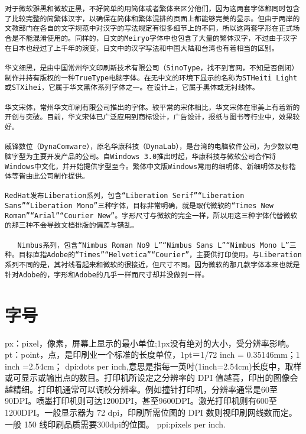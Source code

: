 \begin{verbatim}
对于微软雅黑和微软正黑，不好简单的用简体或者繁体来区分他们，因为这两套字体都同时包含了比较完整的简繁体汉字，以确保在简体和繁体混排的页面上都能够完美的显示。但由于两岸的文教部门在各自的文字规范中对汉字的写法规定有很多细节上的不同，所以这两套字形在正式场合是不能混淆使用的。同样的，日文的Meiryo字体中也包含了大量的繁体汉字，不过由于汉字在日本也经过了上千年的演变，日文中的汉字写法和中国大陆和台湾也有着相当的区别。

华文细黑，是由中国常州华文印刷新技术有限公司（SinoType，找不到官网，不知是否倒闭）制作并持有版权的一种TrueType电脑字体。在无中文的环境下显示的名称为STHeiti Light或STXihei，它属于华文黑体系列字体之一。在设计上，它属于黑体或无衬线体。

华文宋体，常州华文印刷有限公司推出的字体。较平常的宋体相比，华文宋体在审美上有着新的开创与突破。目前，华文宋体已广泛应用到商标设计，广告设计，报纸与图书等行业中，效果较好。

威锋数位（DynaComware），原名华康科技（DynaLab），是台湾的电脑软件公司，为少数以电脑字型为主要开发产品的公司。自Windows 3.0推出时起，华康科技与微软公司合作将Windows中文化，并开始提供字型至今。繁体中文版Windows常用的细明体、新细明体及标楷体等皆由此公司制作提供。

RedHat发布Liberation系列，包含“Liberation Serif”“Liberation Sans”“Liberation Mono”三种字体，目标非常明确，就是取代微软的“Times New Roman”“Arial”“Courier New”。字形尺寸与微软的完全一样，所以用这三种字体代替微软的那三种不会导致文档排版的偏差与错乱。

   Nimbus系列，包含“Nimbus Roman No9 L”“Nimbus Sans L”“Nimbus Mono L”三种。目标直指Adobe的“Times”“Helvetica”“Courier”，主要供打印使用。与Liberation系列不同的是，其衬线看起来和微软的很接近，但尺寸不同。因为微软的那几款字体本来也就是针对Adobe的，字形和Adobe的几乎一样而尺寸却并没做到一样。

\end{verbatim}

















\section{字号}
px：pixel，像素，屏幕上显示的最小单位;1px没有绝对的大小，受分辨率影响。
pt：point，点，是印刷业一个标准的长度单位，1pt＝1/72 inch = 0.35146mm；1 inch =2.54cm；
dpi:dots per inch,意思是指每一英吋(1inch=2.54cm)长度中，取样或可显示或输出点的数目。打印机所设定之分辨率的 DPI 值越高，印出的图像会越精细。打印机通常可以调校分辨率。例如撞针打印机，分辨率通常是60至90DPI。喷墨打印机则可达1200DPI，甚至9600DPI。激光打印机则有600至1200DPI。一般显示器为 72 dpi，印刷所需位图的 DPI 数则视印刷网线数而定。一般 150 线印刷品质需要300dpi的位图。
ppi:pixels per inch.


